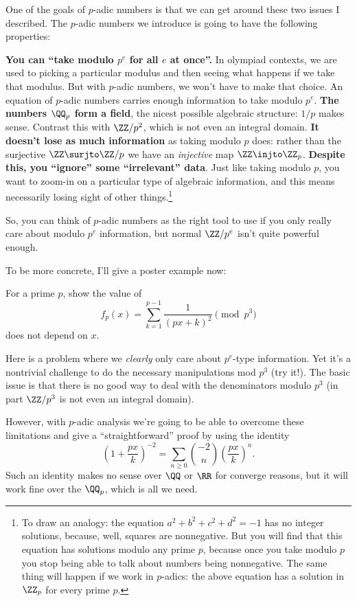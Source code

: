 One of the goals of $p$-adic numbers is that we can get around
these two issues I described.
The $p$-adic numbers we introduce is going to have the following properties:
\begin{enumerate}
	\ii \textbf{You can ``take modulo $p^e$ for all $e$ at once''.}
	In olympiad contexts, we are used to picking a particular modulus and then
	seeing what happens if we take that modulus.
	But with $p$-adic numbers, we won't have to make that choice.
	An equation of $p$-adic numbers carries enough information
	to take modulo $p^e$.
	\ii \textbf{The numbers $\QQ_p$ form a field},
	the nicest possible algebraic structure:
	$1/p$ makes sense.
	Contrast this with $\ZZ/p^2$, which is not even an integral domain.
	\ii \textbf{It doesn't lose as much information}
	as taking modulo $p$ does:
	rather than the surjective $\ZZ \surjto \ZZ/p$ we have an
	\emph{injective} map $\ZZ \injto \ZZ_p$.
	\ii \textbf{Despite this, you ``ignore'' some ``irrelevant'' data}.
	Just like taking modulo $p$, you want to zoom-in on
	a particular type of algebraic information,
	and this means necessarily
	losing sight of other things.\footnote{To draw an analogy: the equation
	$ a^2 + b^2 + c^2 + d^2 = -1$
	has no integer solutions, because, well, squares are nonnegative.
	But you will find that this equation has solutions modulo any prime $p$,
	because once you take modulo $p$ you stop being able to
	talk about numbers being nonnegative.
	The same thing will happen if we work in $p$-adics:
	the above equation has a solution in $\ZZ_p$ for every prime $p$.}
\end{enumerate}
So, you can think of $p$-adic numbers as the right tool to use
if you only really care about modulo $p^e$ information,
but normal $\ZZ/p^e$ isn't quite powerful enough.

To be more concrete, I'll give a poster example now:
\begin{example}
	For a prime $p$, show the value of
	\[ f_p(x) = \sum_{k=1}^{p-1} \frac{1}{(px+k)^2} \pmod{p^3} \]
	does not depend on $x$.
	\label{ex:token}
\end{example}
Here is a problem where we \emph{clearly} only care
about $p^e$-type information.
Yet it's a nontrivial challenge to do the
necessary manipulations mod $p^3$ (try it!).
The basic issue is that there is no good way to deal with
the denominators modulo $p^3$
(in part $\ZZ/p^3$ is not even an integral domain).

However, with $p$-adic analysis we're going to be able
to overcome these limitations and give a ``straightforward'' proof
by using the identity
\[
	\left( 1 + \frac{px}{k} \right)^{-2}
	= \sum_{n \ge 0} \binom{-2}{n} \left( \frac{px}{k} \right)^n.
\]
Such an identity makes no sense over $\QQ$ or $\RR$
for converge reasons,
but it will work fine over the $\QQ_p$, which is all we need.


